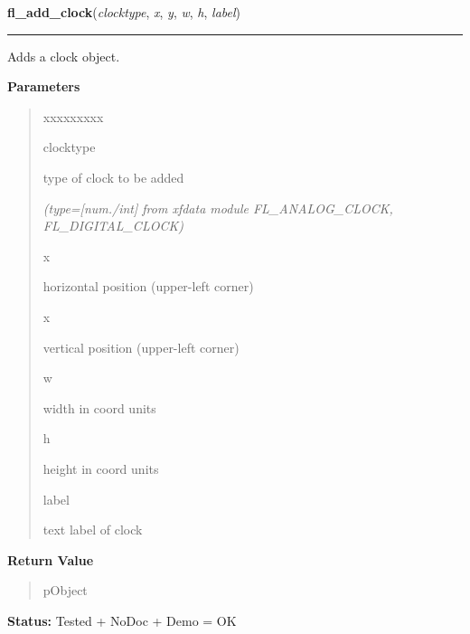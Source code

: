     \vspace{0.5ex}

\hspace{.8\funcindent}\begin{boxedminipage}{\funcwidth}

    \raggedright \textbf{fl\_add\_clock}(\textit{clocktype}, \textit{x}, \textit{y}, \textit{w}, \textit{h}, \textit{label})

    \vspace{-1.5ex}

    \rule{\textwidth}{0.5\fboxrule}
\setlength{\parskip}{2ex}
    Adds a clock object.

\setlength{\parskip}{1ex}
      \textbf{Parameters}
      \vspace{-1ex}

      \begin{quote}
        \begin{Ventry}{xxxxxxxxx}

          \item[clocktype]

          type of clock to be added

            {\it (type=[num./int] from xfdata module FL\_ANALOG\_CLOCK, FL\_DIGITAL\_CLOCK)}

          \item[x]

          horizontal position (upper-left corner)

          \item[x]

          vertical position (upper-left corner)

          \item[w]

          width in coord units

          \item[h]

          height in coord units

          \item[label]

          text label of clock

        \end{Ventry}

      \end{quote}

      \textbf{Return Value}
    \vspace{-1ex}

      \begin{quote}
      pObject

      \end{quote}

\textbf{Status:} Tested + NoDoc + Demo = OK



    \end{boxedminipage}

